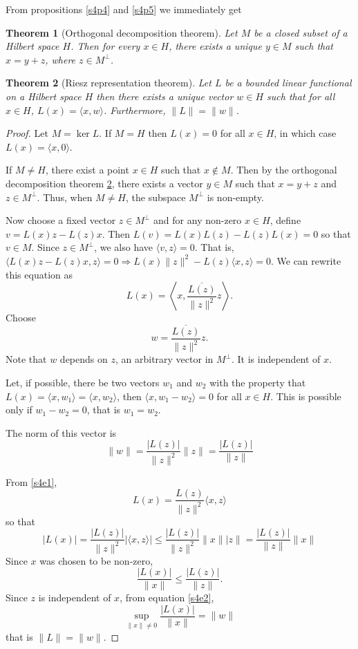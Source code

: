 \documentclass{article}
\theoremstyle{plain}
\newtheorem{thm}{Theorem}
\numberwithin{thm}{section}
\theoremstyle{plain}
\numberwithin{prop}{section}
\theoremstyle{definition}
\numberwithin{defn}{section}
\theoremstyle{remark}
\numberwithin{equation}{section}
\begin{document}
From propositions \ref{s4p4} and \ref{s4p5} we immediately get
\begin{thm}[Orthogonal decomposition theorem]\label{s4t1}
Let $M$ be a closed subset of a Hilbert space $H$. Then for every $x \in H$, 
there exists a unique $y \in M$ such that $x = y + z$, where $z \in M^\perp$.
\end{thm}

\begin{thm}[Riesz representation theorem]\label{s4t2}
Let $L$ be a bounded linear functional on a Hilbert space $H$ then there exists
a unique vector $w \in H$ such that for all $x \in H$, $L(x) = \langle x, w
\rangle$. Furthermore, $\lVert L \rVert = \lVert w \rVert$.
\end{thm}
\begin{proof}
Let $M = \ker L$. If $M = H$ then $L(x) = 0$ for all $x \in H$, in which case
$L(x) = \langle x, 0\rangle$.

If $M \ne H$, there exist a point $x \in H$ such that $x \notin M$. Then by
the orthogonal decomposition theorem \ref{s4t2}, there exists a vector $y \in
M$ such that $x = y + z$ and $z \in M^\perp$. Thus, when $M \ne H$, the subspace
$M^\perp$ is non-empty.

Now choose a fixed vector $z \in M^\perp$ and for any non-zero $x \in H$, define
$v = L(x)z - L(z)x$. Then $L(v) = L(x)L(z) - L(z)L(x) = 0$ so that $v \in
M$. Since $z \in M^\perp$, we also have $\langle v, z\rangle = 0$. That is,
$\langle L(x)z - L(z)x, z\rangle = 0 \Rightarrow L(x)\lVert z \rVert^2 - L(z)
\langle x, z \rangle = 0$. We can rewrite this equation as 
\begin{equation}\label{s4e1}
L(x) = \left\langle x, \frac{\overline{L(z)}}{\lVert z \rVert^2}z\right\rangle.
\end{equation}
Choose
\[
w = \frac{\overline{L(z)}}{\lVert z \rVert^2}z.
\]
Note that $w$ depends on $z$, an arbitrary vector in $M^\perp$. It is 
independent of $x$.

Let, if possible, there be two vectors $w_1$ and $w_2$ with the property
that $L(x) = \langle x, w_1\rangle = \langle x, w_2\rangle$, then $\langle x,
w_1 - w_2\rangle = 0$ for all $x \in H$. This is possible only if $w_1 - w_2 =
0$, that is $w_1 = w_2$.

The norm of this vector is
\begin{equation}\label{s4e2}
\lVert w \rVert = \frac{|L(z)|}{\lVert z \rVert^2}\lVert z \rVert
= \frac{|L(z)|}{\lVert z \rVert}
\end{equation}

From \eqref{s4e1},
\[
L(x) = \frac{L(z)}{\lVert z \rVert^2}\langle x, z\rangle
\]
so that
\[
|L(x)| = \frac{|L(z)|}{\lVert z \rVert^2}|\langle x, z\rangle| \le
\frac{|L(z)|}{\lVert z \rVert^2}\lVert x \rVert\lvert z \rVert = 
\frac{|L(z)|}{\lVert z \rVert}\lVert x \rVert
\]
Since $x$ was chosen to be non-zero,
\[
\frac{|L(x)|}{\lVert x \rVert} \le \frac{|L(z)|}{\lVert z \rVert}.
\]
Since $z$ is independent of $x$, from equation \eqref{s4e2},
\[
\sup_{\lVert x \rVert \ne 0}\frac{|L(x)|}{\lVert x \rVert} = \lVert w \rVert
\]
that is $\lVert L \rVert = \lVert w \rVert$.
\end{proof}
\end{document}
